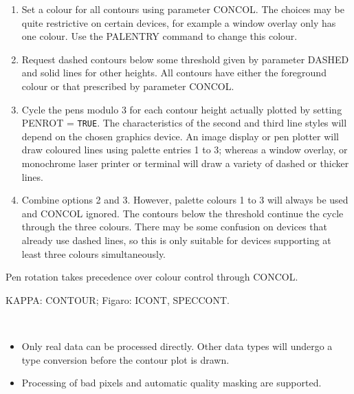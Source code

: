 \documentclass[twoside,11pt]{article}
\newcommand{\sstdiytopic}[2]{\goodbreak \item[{\hspace{-0.35em}#1\hspace{-0.35em}:}] \mbox{} \\[1.3ex] #2}
\newcommand{\sstimplementationstatus}[1]{
   \pagebreak[3] \item[{Implementation Status:}] \mbox{} \\[1.3ex] #1}
\newenvironment{sstitemize}{%
  \vspace{-4.3ex}\begin{itemize}}{\end{itemize}}
\newcommand{\sstitemlist}[1]{
  \mbox{} \\
  \vspace{-3.5ex}
  \begin{sstitemize}
     #1
  \end{sstitemize}
}
\newcommand{\sstitem}{\item}
\renewcommand{\sstdiytopic}[2]{\item[{#1}]
      \begin{description}
         #2
      \end{description}
   }
\renewcommand{\sstimplementationstatus}[1]{\item[Implementation Status:] 
      \begin{description}
         #1
      \end{description}
   }
\newcommand{\sstitemlist}[1]{
      \begin{itemize}
         #1
      \end{itemize}
   }
\begin{document}
{{{         \begin{enumerate}
         \item Set a colour for all contours using parameter CONCOL.
               The choices may be quite restrictive on certain devices,
               for example a window overlay only has one colour.  Use
               the PALENTRY command to change this colour.
         \item Request dashed contours below some threshold given by
               parameter DASHED and solid lines for other heights.  All
               contours have either the foreground colour or that
               prescribed by parameter CONCOL.
         \item Cycle the pens modulo 3 for each contour height actually
               plotted by setting PENROT = {\tt TRUE}.  The characteristics of
               the second and third line styles will depend on the chosen
               graphics device.  An image display or pen plotter will draw
               coloured lines using palette entries 1 to 3; whereas a
               window overlay, or monochrome laser printer or terminal
               will draw a variety of dashed or thicker lines.
         \item Combine options 2 and 3.  However, palette colours 1 to 3
               will always be used and CONCOL ignored.  The contours below
               the threshold continue the cycle through the three colours.
               There may be some confusion on devices that already use
               dashed lines, so this is only suitable for devices
               supporting at least three colours simultaneously.
         \end{enumerate}

         Pen rotation takes precedence over colour control through CONCOL. 
      }
   }
   \sstdiytopic{
      Related Applications
   }{
      KAPPA: CONTOUR; Figaro: ICONT, SPECCONT.
   }
   \sstimplementationstatus{
      \sstitemlist{

         \sstitem
         Only real data can be processed directly.  Other data types
         will undergo a type conversion before the contour plot is drawn.

         \sstitem
         Processing of bad pixels and automatic quality masking are supported.

      }
   }
}
\end{document}

